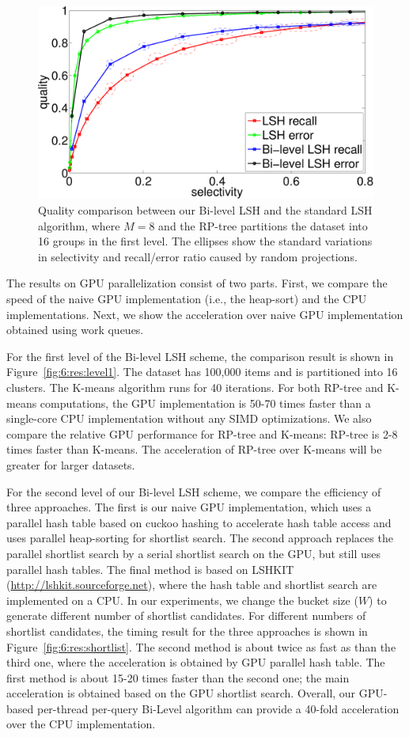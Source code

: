 \begin{figure}[!h]
  \centering
  \includegraphics[width=0.8\linewidth]{figs/6/res/compare_L20_mh.pdf}
  \caption[Quality comparison between the Bi-level LSH and the standard LSH algorithm]{\label{fig:6:res:quality} Quality comparison between our Bi-level LSH and the standard LSH algorithm, where $M = 8$ and the RP-tree partitions the dataset into 16 groups in the first level. The ellipses show the standard variations in selectivity and recall/error ratio caused by random projections.}
\end{figure}

The results on GPU parallelization consist of two parts. First, we compare the speed of the naive GPU implementation (i.e., the heap-sort) and the CPU implementations. Next, we show the acceleration over naive GPU implementation obtained using work queues.

For the first level of the Bi-level LSH scheme, the comparison result is shown in Figure~\ref{fig:6:res:level1}. The dataset has 100,000 items and is partitioned into 16 clusters. The K-means algorithm runs for 40 iterations.
For both RP-tree and K-means computations, the GPU implementation is 50-70 times faster than a single-core CPU implementation without any SIMD optimizations. We also compare the relative GPU performance for RP-tree and K-means: RP-tree is 2-8 times faster than K-means. The acceleration of RP-tree over K-means will be greater for larger datasets.

For the second level of our Bi-level LSH scheme, we compare the efficiency of three approaches. The first is our naive GPU implementation, which uses a parallel hash table based on cuckoo hashing to accelerate hash table access and uses parallel heap-sorting for shortlist search. The second approach replaces the parallel shortlist search by a serial shortlist search on the GPU, but still uses parallel hash tables. The final method is based on LSHKIT ({\small \url{http://lshkit.sourceforge.net}}), where the hash table and shortlist search are implemented on a CPU. In our experiments, we change the bucket size ($W$) to generate different number of shortlist candidates. For different numbers of shortlist candidates, the timing result for the three approaches is shown in Figure~\ref{fig:6:res:shortlist}. The second method is about twice as fast as than the third one, where the acceleration is obtained by GPU parallel hash table. The first method is about 15-20 times faster than the second one; the main acceleration is obtained based on the GPU shortlist search. Overall, our GPU-based per-thread per-query Bi-Level algorithm can provide a 40-fold acceleration over the CPU implementation.

